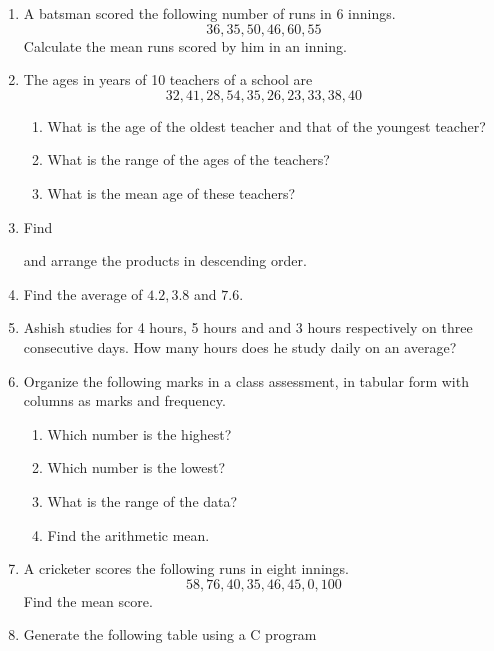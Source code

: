 \begin{enumerate}[label=\thesection.\arabic*, ref=\thesection.\theenumi]
\item A batsman scored the following number of runs in 6 innings.  
	$$36, 35, 50, 46, 60, 55$$
	Calculate the mean runs scored by him in an inning.
	\\
	\solution
	
\item The ages in years of 10 teachers of a school are
	$$32, 41, 28, 54, 35, 26, 23, 33, 38, 40$$
	\begin{enumerate}
		\item What is the age of the oldest teacher and that of the youngest teacher?
			\\
			\solution
	
		\item What is the range of the ages of the teachers?
		\item What is the mean age of these teachers?
	\end{enumerate}
\item Find
	\begin{enumerate}
	\begin{multicols}{3}
	\item $2.7\times 4$
	\item $1.8\times 1.2$
	\item $2.3\times 4.35$
	\end{multicols}
	\end{enumerate}
and arrange the products in descending order.
\item Find the average of $4.2, 3.8$ and $7.6$.
\item Ashish studies for 4 hours, 5 hours and and 3 hours respectively on three consecutive days.  How many hours does he study daily on an average?
\item Organize the following marks in a class assessment, in tabular form with columns as marks and frequency.
	\begin{enumerate}
		\item Which number is the highest?
		\item Which number is the lowest?
		\item What is the range of the data?
		\item Find the arithmetic mean.
	\end{enumerate}
\item A cricketer scores the following runs in eight innings.
	$$58, 76, 40, 35, 46, 45, 0, 100$$
	Find the mean score.
\item Generate the following table using a C program

\end{enumerate}
